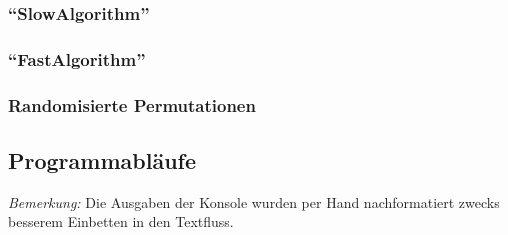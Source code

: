 \subsubsection{``SlowAlgorithm''}
\subsubsection{``FastAlgorithm''}
\subsubsection{Randomisierte Permutationen}

\newpage
\subsection{Programmabläufe}
\begin{flushright}
  \begin{scriptsize}
  \emph{Bemerkung:} Die Ausgaben der Konsole wurden per Hand nachformatiert zwecks besserem Einbetten in den Textfluss.
  \end{scriptsize}
\end{flushright}
